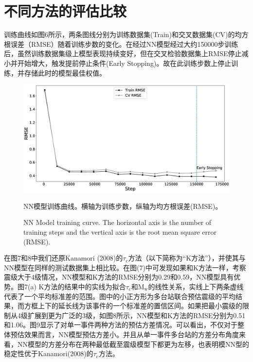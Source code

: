 \section{不同方法的评估比较}
\indent 训练曲线如图6所示，两条图线分别为训练数据集(Train)和交叉数据集(CV)的均方根误差（RMSE）随着训练步数的变化。在经过NN模型经过大约150000步训练后，虽然训练数据集级上模型表现持续变好，但在交叉检验数据集上RMSE停止减小并开始增大，触发提前停止条件(Early Stopping)。故在此训练步数上停止训练，并存储此时的模型最佳权值。\\
\begin{figure}[!h] 
\centering 
 \includegraphics[width=0.8\linewidth]{img/6.eps} 
 \renewcommand{\figurename}{图} 
\caption{NN模型训练曲线。横轴为训练步数，纵轴为均方根误差(RMSE)。} 
\addtocounter{figure}{-1} \vspace{-5pt} 
\renewcommand{\figurename}{Fig} 
\caption{NN Model training curve. The horizontal axis is the number of training steps and the vertical axis is the root mean square error (RMSE).} 
\renewcommand{\figurename}{图} 
\label{fig:network-device-influence.png} 
\end{figure}
\indent 在图7和8中我们还原Kanamori (2008)的$\tau_{\mathrm{c}}$方法（以下简称为“K方法”），并使其与NN模型在同样的测试数据集上相比较。在图(7)中可发现如果和K方法一样，考察震级大于4级情况，NN模型和K方法的RMSE分别为0.29和0.59，NN模型具有优势。图7(a) K方法的结果中的实线为拟合$\tau_{\mathrm{c}}$和$\mathrm{M}_{\mathrm{w}}$的线性关系，实线上下两条虚线代表了一个平均标准差的范围。图中的小正方形为多台站联合预估震级的平均结果，而方框上下的延长线为该事件的一个标准差的置信区间。如果把最小震级的限制从4级扩展到更为广泛的3级，如图8所示，NN模型和K方法的RMSE分别为0.51和1.06。图9显示了对单一事件两种方法的预估方差情况。可以看出，不仅对于整体预估效果而言，NN模型预估方差小。并且从单一事件多台站的方差分布角度来看，NN模型的方差分布在两种最低截至震级模型下都更为左移，也表明模NN型的稳定性优于Kanamori(2008)的$\tau_{\mathrm{c}}$方法。

